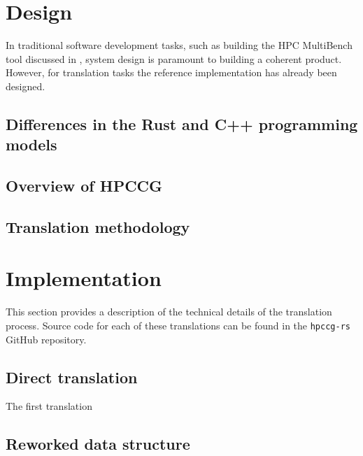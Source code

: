 \section{Design}
\label{sec:translation-design} %

In traditional software development tasks, such as building the HPC MultiBench tool discussed in , system design is paramount to building a coherent product. However, for translation tasks the reference implementation has already been designed.


\subsection{Differences in the Rust and C++ programming models}
\label{sec:overview-hpccg}

\subsection{Overview of HPCCG}
\label{sec:overview-hpccg}


\subsection{Translation methodology}
\label{sec:translation-methodology}


\section{Implementation}
\label{sec:translation-implementation} %

This section provides a description of the technical details of the translation process. Source code for each of these translations can be found in the \texttt{hpccg-rs} GitHub repository.


\subsection{Direct translation}
\label{sec:translation-direct}
The first translation 


\subsection{Reworked data structure}
\label{sec:translation-reworked-data-structure}

